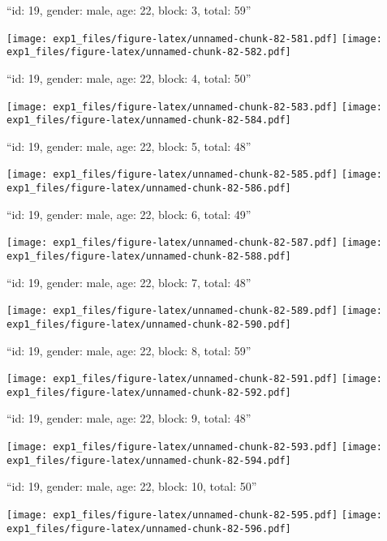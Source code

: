 \documentclass[11pt,,]{article}
\begin{document}
\newpage
[1] 

``id: 19, gender: male, age: 22, block: 3, total: 59''

\texttt{[image: exp1\_files/figure-latex/unnamed-chunk-82-581.pdf]}
\texttt{[image: exp1\_files/figure-latex/unnamed-chunk-82-582.pdf]}

\newpage
[1] 

``id: 19, gender: male, age: 22, block: 4, total: 50''

\texttt{[image: exp1\_files/figure-latex/unnamed-chunk-82-583.pdf]}
\texttt{[image: exp1\_files/figure-latex/unnamed-chunk-82-584.pdf]}

\newpage
[1] 

``id: 19, gender: male, age: 22, block: 5, total: 48''

\texttt{[image: exp1\_files/figure-latex/unnamed-chunk-82-585.pdf]}
\texttt{[image: exp1\_files/figure-latex/unnamed-chunk-82-586.pdf]}

\newpage
[1] 

``id: 19, gender: male, age: 22, block: 6, total: 49''

\texttt{[image: exp1\_files/figure-latex/unnamed-chunk-82-587.pdf]}
\texttt{[image: exp1\_files/figure-latex/unnamed-chunk-82-588.pdf]}

\newpage
[1] 

``id: 19, gender: male, age: 22, block: 7, total: 48''

\texttt{[image: exp1\_files/figure-latex/unnamed-chunk-82-589.pdf]}
\texttt{[image: exp1\_files/figure-latex/unnamed-chunk-82-590.pdf]}

\newpage
[1] 

``id: 19, gender: male, age: 22, block: 8, total: 59''

\texttt{[image: exp1\_files/figure-latex/unnamed-chunk-82-591.pdf]}
\texttt{[image: exp1\_files/figure-latex/unnamed-chunk-82-592.pdf]}

\newpage
[1] 

``id: 19, gender: male, age: 22, block: 9, total: 48''

\texttt{[image: exp1\_files/figure-latex/unnamed-chunk-82-593.pdf]}
\texttt{[image: exp1\_files/figure-latex/unnamed-chunk-82-594.pdf]}

\newpage
[1] 

``id: 19, gender: male, age: 22, block: 10, total: 50''

\texttt{[image: exp1\_files/figure-latex/unnamed-chunk-82-595.pdf]}
\texttt{[image: exp1\_files/figure-latex/unnamed-chunk-82-596.pdf]}
\end{document}
